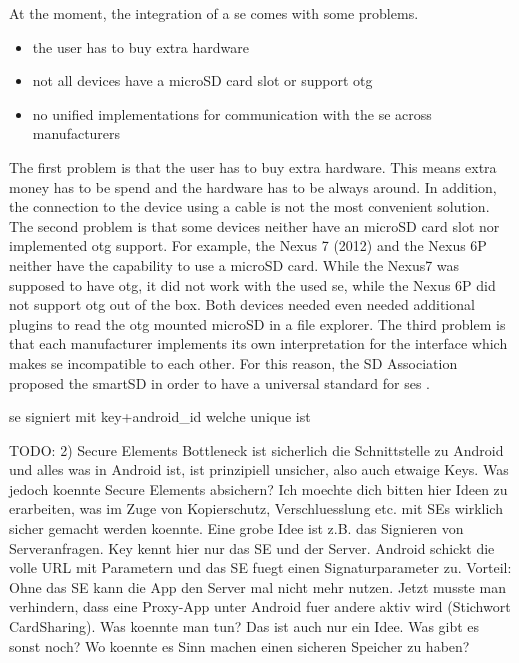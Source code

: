 At the moment, the integration of a \gls{se} comes with some problems.
\begin{itemize}
  \item the user has to buy extra hardware
  \item not all devices have a microSD card slot or support \gls{otg}
  \item no unified implementations for communication with the \gls{se} across manufacturers
\end{itemize}
The first problem is that the user has to buy extra hardware.
This means extra money has to be spend and the hardware has to be always around.
In addition, the connection to the device using a cable is not the most convenient solution.
\newline
The second problem is that some devices neither have an microSD card slot nor implemented \gls{otg} support.
For example, the Nexus 7 (2012) and the Nexus 6P neither have the capability to use a microSD card.
While the Nexus7 was supposed to have \gls{otg}, it did not work with the used \gls{se}, while the Nexus 6P did not support \gls{otg} out of the box.
Both devices needed even needed additional plugins to read the \gls{otg} mounted microSD in a file explorer.
The third problem is that each manufacturer implements its own interpretation for the interface which makes \gls{se} incompatible to each other.
For this reason, the SD Association proposed the smartSD in order to have a universal standard for \gls{se}s \cite{smartSD}.
\newline


se signiert mit key+android\_id welche unique ist

TODO:
2) Secure Elements
Bottleneck ist sicherlich die Schnittstelle zu Android und alles was in Android ist, ist prinzipiell unsicher, also auch etwaige Keys. Was jedoch koennte Secure Elements absichern? Ich moechte dich bitten hier Ideen zu erarbeiten, was im Zuge von Kopierschutz,  Verschluesslung etc. mit SEs wirklich sicher gemacht werden koennte. Eine grobe Idee ist z.B. das Signieren von Serveranfragen. Key kennt hier nur das SE und der Server. Android schickt die volle URL mit Parametern und das SE fuegt einen Signaturparameter zu. Vorteil: Ohne das SE kann die App den Server mal nicht mehr nutzen. Jetzt musste man verhindern, dass eine Proxy-App unter Android fuer andere aktiv wird (Stichwort CardSharing). Was koennte man tun? Das ist auch nur ein Idee. Was gibt es sonst noch? Wo koennte es Sinn machen einen sicheren Speicher zu haben?
